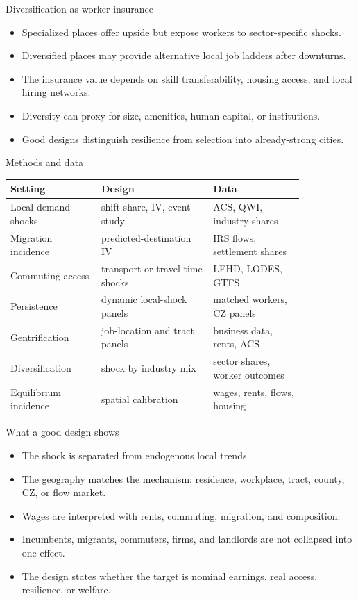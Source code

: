 \documentclass[aspectratio=169,11pt]{beamer}
\begin{document}
\begin{frame}{Diversification as worker insurance}
\begin{itemize}
    \item Specialized places offer upside but expose workers to sector-specific shocks.
    \item Diversified places may provide alternative local job ladders after downturns.
    \item The insurance value depends on skill transferability, housing access, and local hiring networks.
    \item Diversity can proxy for size, amenities, human capital, or institutions.
    \item Good designs distinguish resilience from selection into already-strong cities.
\end{itemize}
\end{frame}

\begin{frame}{Methods and data}
\small
\begin{tabular}{p{0.26\linewidth} p{0.32\linewidth} p{0.26\linewidth}}
\toprule
Setting & Design & Data \\
\midrule
Local demand shocks & shift-share, IV, event study & ACS, QWI, industry shares \\
Migration incidence & predicted-destination IV & IRS flows, settlement shares \\
Commuting access & transport or travel-time shocks & LEHD, LODES, GTFS \\
Persistence & dynamic local-shock panels & matched workers, CZ panels \\
Gentrification & job-location and tract panels & business data, rents, ACS \\
Diversification & shock by industry mix & sector shares, worker outcomes \\
Equilibrium incidence & spatial calibration & wages, rents, flows, housing \\
\bottomrule
\end{tabular}
\end{frame}

\begin{frame}{What a good design shows}
\begin{itemize}
    \item The shock is separated from endogenous local trends.
    \item The geography matches the mechanism: residence, workplace, tract, county, CZ, or flow market.
    \item Wages are interpreted with rents, commuting, migration, and composition.
    \item Incumbents, migrants, commuters, firms, and landlords are not collapsed into one effect.
    \item The design states whether the target is nominal earnings, real access, resilience, or welfare.
\end{itemize}
\end{frame}
\end{document}
